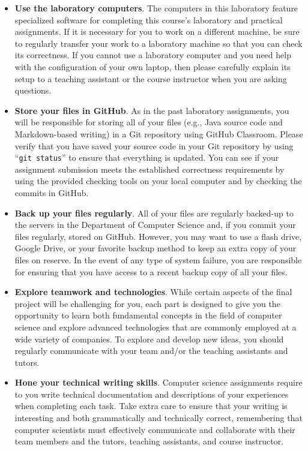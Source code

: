 \documentclass[11pt]{article}
\newcommand{\command}[1]{``\lstinline{#1}''}
\begin{document}
\begin{itemize}
  \setlength{\itemsep}{0pt}

\item {\bf Use the laboratory computers}. The computers in this laboratory
  feature specialized software for completing this course's laboratory and
  practical assignments. If it is necessary for you to work on a different
  machine, be sure to regularly transfer your work to a laboratory machine so
  that you can check its correctness. If you cannot use a laboratory computer
  and you need help with the configuration of your own laptop, then please
  carefully explain its setup to a teaching assistant or the course instructor
  when you are asking questions.

\item {\bf Store your files in GitHub}. As in the past laboratory assignments,
  you will be responsible for storing all of your files (e.g., Java source code
  and Markdown-based writing) in a Git repository using GitHub Classroom. Please
  verify that you have saved your source code in your Git repository by using
  \command{git status} to ensure that everything is updated. You can see if your
  assignment submission meets the established correctness requirements by using
  the provided checking tools on your local computer and by checking the commits
  in GitHub.

\item {\bf Back up your files regularly}. All of your files are regularly
  backed-up to the servers in the Department of Computer Science and, if you
  commit your files regularly, stored on GitHub. However, you may want to use a
  flash drive, Google Drive, or your favorite backup method to keep an extra
  copy of your files on reserve. In the event of any type of system failure, you
  are responsible for ensuring that you have access to a recent backup copy of
  all your files.

\item {\bf Explore teamwork and technologies}. While certain aspects of the
  final project will be challenging for you, each part is designed to give you
  the opportunity to learn both fundamental concepts in the field of computer
  science and explore advanced technologies that are commonly employed at a wide
  variety of companies. To explore and develop new ideas, you should regularly
  communicate with your team and/or the teaching assistants and tutors.

\item {\bf Hone your technical writing skills}. Computer science assignments
  require to you write technical documentation and descriptions of your
  experiences when completing each task. Take extra care to ensure that your
  writing is interesting and both grammatically and technically correct,
  remembering that computer scientists must effectively communicate and
  collaborate with their team members and the tutors, teaching assistants, and
  course instructor.


\end{itemize}
\end{document}
